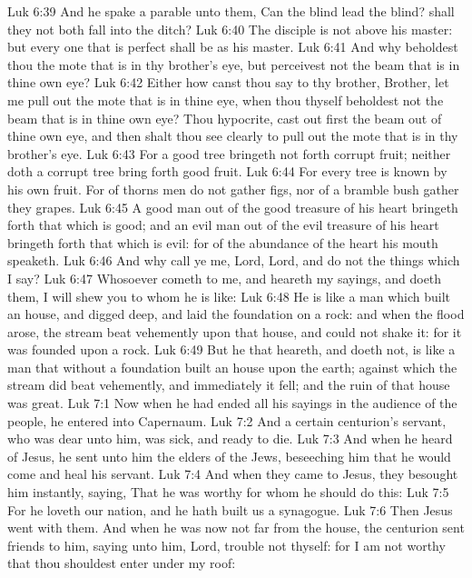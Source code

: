 \vs Luk 6:39 And he spake a parable unto them, Can the blind lead the blind? shall they not both fall into the ditch?
\vs Luk 6:40 The disciple is not above his master: but every one that is perfect shall be as his master.
\vs Luk 6:41 And why beholdest thou the mote that is in thy brother's eye, but perceivest not the beam that is in thine own eye?
\vs Luk 6:42 Either how canst thou say to thy brother, Brother, let me pull out the mote that is in thine eye, when thou thyself beholdest not the beam that is in thine own eye? Thou hypocrite, cast out first the beam out of thine own eye, and then shalt thou see clearly to pull out the mote that is in thy brother's eye.
\vs Luk 6:43 For a good tree bringeth not forth corrupt fruit; neither doth a corrupt tree bring forth good fruit.
\vs Luk 6:44 For every tree is known by his own fruit. For of thorns men do not gather figs, nor of a bramble bush gather they grapes.
\vs Luk 6:45 A good man out of the good treasure of his heart bringeth forth that which is good; and an evil man out of the evil treasure of his heart bringeth forth that which is evil: for of the abundance of the heart his mouth speaketh.
\vs Luk 6:46 And why call ye me, Lord, Lord, and do not the things which I say?
\vs Luk 6:47 Whosoever cometh to me, and heareth my sayings, and doeth them, I will shew you to whom he is like:
\vs Luk 6:48 He is like a man which built an house, and digged deep, and laid the foundation on a rock: and when the flood arose, the stream beat vehemently upon that house, and could not shake it: for it was founded upon a rock.
\vs Luk 6:49 But he that heareth, and doeth not, is like a man that without a foundation built an house upon the earth; against which the stream did beat vehemently, and immediately it fell; and the ruin of that house was great.
\vs Luk 7:1 Now when he had ended all his sayings in the audience of the people, he entered into Capernaum.
\vs Luk 7:2 And a certain centurion's servant, who was dear unto him, was sick, and ready to die.
\vs Luk 7:3 And when he heard of Jesus, he sent unto him the elders of the Jews, beseeching him that he would come and heal his servant.
\vs Luk 7:4 And when they came to Jesus, they besought him instantly, saying, That he was worthy for whom he should do this:
\vs Luk 7:5 For he loveth our nation, and he hath built us a synagogue.
\vs Luk 7:6 Then Jesus went with them. And when he was now not far from the house, the centurion sent friends to him, saying unto him, Lord, trouble not thyself: for I am not worthy that thou shouldest enter under my roof:
